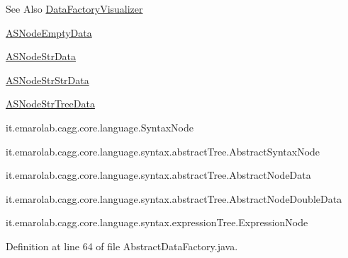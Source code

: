 \begin{DoxySeeAlso}{See Also}
\hyperlink{classit_1_1emarolab_1_1cagg_1_1core_1_1language_1_1syntax_1_1abstractTree_1_1AbstractDataFactory_1_1DataFactoryVisualizer}{Data\-Factory\-Visualizer} 

\hyperlink{classit_1_1emarolab_1_1cagg_1_1core_1_1language_1_1syntax_1_1abstractTree_1_1AbstractDataFactory_1_1ASNodeEmptyData}{A\-S\-Node\-Empty\-Data} 

\hyperlink{classit_1_1emarolab_1_1cagg_1_1core_1_1language_1_1syntax_1_1abstractTree_1_1AbstractDataFactory_1_1ASNodeStrData}{A\-S\-Node\-Str\-Data} 

\hyperlink{classit_1_1emarolab_1_1cagg_1_1core_1_1language_1_1syntax_1_1abstractTree_1_1AbstractDataFactory_1_1ASNodeStrStrData}{A\-S\-Node\-Str\-Str\-Data} 

\hyperlink{classit_1_1emarolab_1_1cagg_1_1core_1_1language_1_1syntax_1_1abstractTree_1_1AbstractDataFactory_1_1ASNodeStrTreeData}{A\-S\-Node\-Str\-Tree\-Data} 

it.\-emarolab.\-cagg.\-core.\-language.\-Syntax\-Node 

it.\-emarolab.\-cagg.\-core.\-language.\-syntax.\-abstract\-Tree.\-Abstract\-Syntax\-Node 

it.\-emarolab.\-cagg.\-core.\-language.\-syntax.\-abstract\-Tree.\-Abstract\-Node\-Data 

it.\-emarolab.\-cagg.\-core.\-language.\-syntax.\-abstract\-Tree.\-Abstract\-Node\-Double\-Data 

it.\-emarolab.\-cagg.\-core.\-language.\-syntax.\-expression\-Tree.\-Expression\-Node 
\end{DoxySeeAlso}


Definition at line 64 of file Abstract\-Data\-Factory.\-java.



